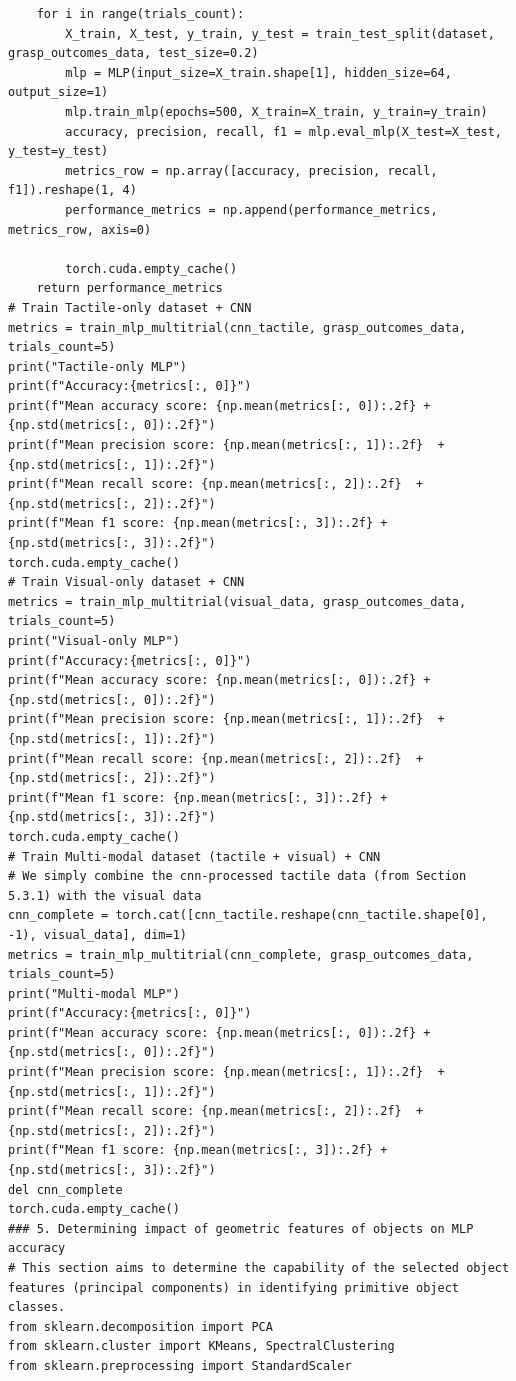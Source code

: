 \documentclass[11pt, a4paper]{report}
\begin{document}
\begin{lstlisting}
    for i in range(trials_count):
        X_train, X_test, y_train, y_test = train_test_split(dataset, grasp_outcomes_data, test_size=0.2)
        mlp = MLP(input_size=X_train.shape[1], hidden_size=64, output_size=1)
        mlp.train_mlp(epochs=500, X_train=X_train, y_train=y_train)
        accuracy, precision, recall, f1 = mlp.eval_mlp(X_test=X_test, y_test=y_test)
        metrics_row = np.array([accuracy, precision, recall, f1]).reshape(1, 4)
        performance_metrics = np.append(performance_metrics, metrics_row, axis=0)

        torch.cuda.empty_cache()
    return performance_metrics
# Train Tactile-only dataset + CNN
metrics = train_mlp_multitrial(cnn_tactile, grasp_outcomes_data, trials_count=5)
print("Tactile-only MLP")
print(f"Accuracy:{metrics[:, 0]}")
print(f"Mean accuracy score: {np.mean(metrics[:, 0]):.2f} + {np.std(metrics[:, 0]):.2f}")
print(f"Mean precision score: {np.mean(metrics[:, 1]):.2f}  + {np.std(metrics[:, 1]):.2f}")
print(f"Mean recall score: {np.mean(metrics[:, 2]):.2f}  + {np.std(metrics[:, 2]):.2f}")
print(f"Mean f1 score: {np.mean(metrics[:, 3]):.2f} + {np.std(metrics[:, 3]):.2f}")
torch.cuda.empty_cache()
# Train Visual-only dataset + CNN
metrics = train_mlp_multitrial(visual_data, grasp_outcomes_data, trials_count=5)
print("Visual-only MLP")
print(f"Accuracy:{metrics[:, 0]}")
print(f"Mean accuracy score: {np.mean(metrics[:, 0]):.2f} + {np.std(metrics[:, 0]):.2f}")
print(f"Mean precision score: {np.mean(metrics[:, 1]):.2f}  + {np.std(metrics[:, 1]):.2f}")
print(f"Mean recall score: {np.mean(metrics[:, 2]):.2f}  + {np.std(metrics[:, 2]):.2f}")
print(f"Mean f1 score: {np.mean(metrics[:, 3]):.2f} + {np.std(metrics[:, 3]):.2f}")
torch.cuda.empty_cache()
# Train Multi-modal dataset (tactile + visual) + CNN
# We simply combine the cnn-processed tactile data (from Section 5.3.1) with the visual data
cnn_complete = torch.cat([cnn_tactile.reshape(cnn_tactile.shape[0], -1), visual_data], dim=1)
metrics = train_mlp_multitrial(cnn_complete, grasp_outcomes_data, trials_count=5)
print("Multi-modal MLP")
print(f"Accuracy:{metrics[:, 0]}")
print(f"Mean accuracy score: {np.mean(metrics[:, 0]):.2f} + {np.std(metrics[:, 0]):.2f}")
print(f"Mean precision score: {np.mean(metrics[:, 1]):.2f}  + {np.std(metrics[:, 1]):.2f}")
print(f"Mean recall score: {np.mean(metrics[:, 2]):.2f}  + {np.std(metrics[:, 2]):.2f}")
print(f"Mean f1 score: {np.mean(metrics[:, 3]):.2f} + {np.std(metrics[:, 3]):.2f}")
del cnn_complete
torch.cuda.empty_cache()
### 5. Determining impact of geometric features of objects on MLP accuracy
# This section aims to determine the capability of the selected object features (principal components) in identifying primitive object classes.
from sklearn.decomposition import PCA
from sklearn.cluster import KMeans, SpectralClustering
from sklearn.preprocessing import StandardScaler



\end{lstlisting}
\end{document}
